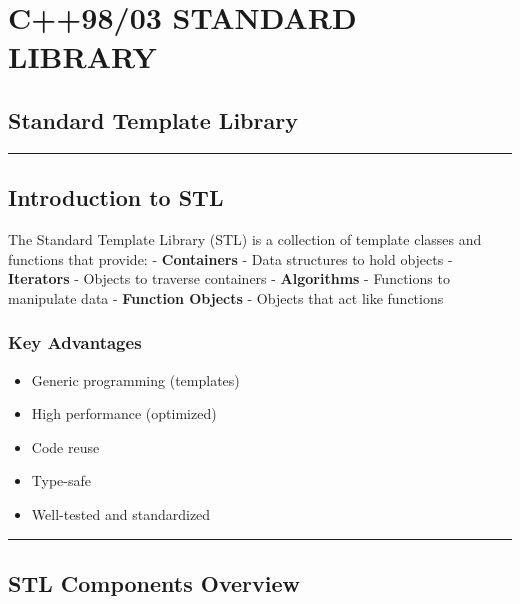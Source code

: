 \hypertarget{c9803-standard-library}{%
\chapter{C++98/03 STANDARD LIBRARY}\label{c9803-standard-library}}

\hypertarget{standard-template-library}{%
\section{Standard Template Library}\label{standard-template-library}}

\begin{center}\rule{0.5\linewidth}{0.5pt}\end{center}

\hypertarget{introduction-to-stl}{%
\section{Introduction to STL}\label{introduction-to-stl}}

The Standard Template Library (STL) is a collection of template classes
and functions that provide: - \textbf{Containers} - Data structures to
hold objects - \textbf{Iterators} - Objects to traverse containers -
\textbf{Algorithms} - Functions to manipulate data - \textbf{Function
Objects} - Objects that act like functions

\hypertarget{key-advantages}{%
\subsection{Key Advantages}\label{key-advantages}}

\begin{itemize}
\tightlist
\item
  Generic programming (templates)
\item
  High performance (optimized)
\item
  Code reuse
\item
  Type-safe
\item
  Well-tested and standardized
\end{itemize}

\begin{center}\rule{0.5\linewidth}{0.5pt}\end{center}

\hypertarget{stl-components-overview}{%
\section{STL Components Overview}\label{stl-components-overview}}

